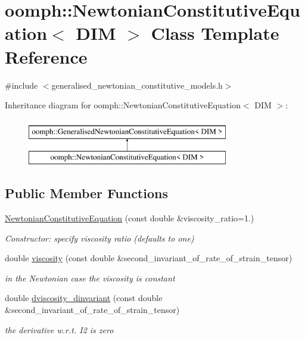 \hypertarget{classoomph_1_1NewtonianConstitutiveEquation}{}\section{oomph\+:\+:Newtonian\+Constitutive\+Equation$<$ D\+IM $>$ Class Template Reference}
\label{classoomph_1_1NewtonianConstitutiveEquation}


{\ttfamily \#include $<$generalised\+\_\+newtonian\+\_\+constitutive\+\_\+models.\+h$>$}

Inheritance diagram for oomph\+:\+:Newtonian\+Constitutive\+Equation$<$ D\+IM $>$\+:\begin{figure}[H]
\begin{center}
\leavevmode
\includegraphics[height=2.000000cm]{classoomph_1_1NewtonianConstitutiveEquation}
\end{center}
\end{figure}
\subsection*{Public Member Functions}
\begin{DoxyCompactItemize}
\item 
\hyperlink{classoomph_1_1NewtonianConstitutiveEquation_aaa9259f124864ea37f8d30e7f884c41b}{Newtonian\+Constitutive\+Equation} (const double \&viscosity\+\_\+ratio=1.)
\begin{DoxyCompactList}\small\item\em Constructor\+: specify viscosity ratio (defaults to one) \end{DoxyCompactList}\item 
double \hyperlink{classoomph_1_1NewtonianConstitutiveEquation_a28c8373040e25ce4027be08dd49aa444}{viscosity} (const double \&second\+\_\+invariant\+\_\+of\+\_\+rate\+\_\+of\+\_\+strain\+\_\+tensor)
\begin{DoxyCompactList}\small\item\em in the Newtonian case the viscosity is constant \end{DoxyCompactList}\item 
double \hyperlink{classoomph_1_1NewtonianConstitutiveEquation_aa4160d3707e40c7478047f5800733225}{dviscosity\+\_\+dinvariant} (const double \&second\+\_\+invariant\+\_\+of\+\_\+rate\+\_\+of\+\_\+strain\+\_\+tensor)
\begin{DoxyCompactList}\small\item\em the derivative w.\+r.\+t. I2 is zero \end{DoxyCompactList}\end{DoxyCompactItemize}
